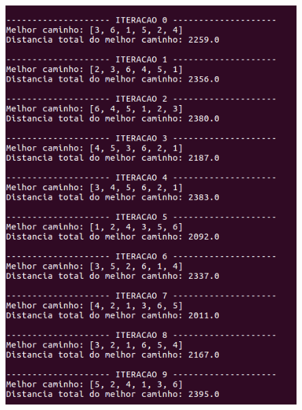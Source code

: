 \documentclass[hidelinks,12pt]{article}
\begin{document}
		\begin{figure}[!h]
			\centering
			\includegraphics[scale=0.6]{Figures/m6-1-1.png}
		\end{figure}

		\newpage
\end{document}
